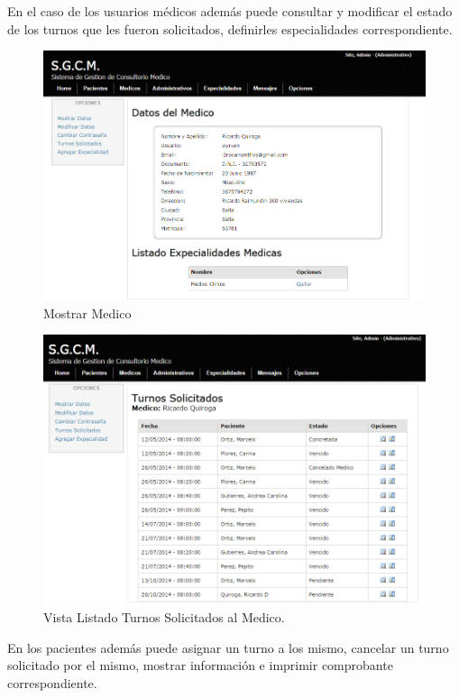 En el caso de los usuarios médicos además puede consultar y modificar el estado de los turnos que les fueron solicitados, definirles especialidades correspondiente.

\begin{figure}[H]
    \centering
    \includegraphics[scale=0.5]{resourse/datos-medico-a.png}
    \caption{Mostrar Medico}
    \label{fig:614}
\end{figure}


\begin{figure}[H]
    \centering
    \includegraphics[scale=0.5]{resourse/turnos-sol-medico.png}
    \caption{Vista Listado Turnos Solicitados al Medico.}
    \label{fig:617}
\end{figure}


En los pacientes además puede asignar un turno a los mismo, cancelar un turno solicitado por el mismo, mostrar información e imprimir comprobante correspondiente.

